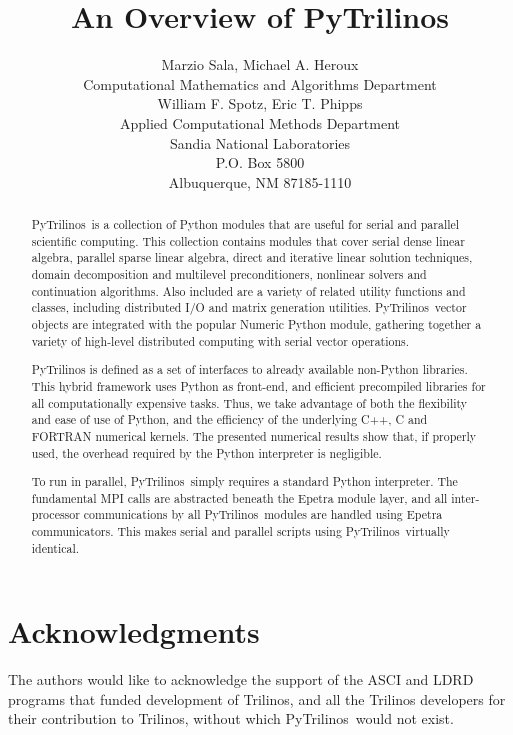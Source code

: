 \documentclass[10pt,relax]{SANDreport}
\author{Marzio Sala, Michael A. Heroux\\
Computational Mathematics and Algorithms Department \\ [10pt]
William F. Spotz, Eric T. Phipps \\
Applied Computational Methods Department \\ [10pt]
Sandia National Laboratories \\
P.O. Box 5800 \\
Albuquerque, NM 87185-1110 \\
}
\title{An Overview of PyTrilinos}
\newcommand{\PyTrilinos}{{PyTrilinos}}
\begin{document}
\maketitle

\begin{abstract}
\PyTrilinos\ is a collection of Python modules that are useful for
serial and parallel scientific computing. This collection contains
modules that cover serial dense linear algebra, parallel sparse linear
algebra, direct and iterative linear solution techniques, domain
decomposition and multilevel preconditioners, nonlinear solvers and
continuation algorithms. Also included are a variety of related
utility functions and classes, including distributed I/O and matrix generation
utilities.
\PyTrilinos\ vector objects are integrated with the popular Numeric
Python module, gathering together a variety of high-level distributed
computing with serial vector operations.

PyTrilinos is defined as a set of interfaces to already available non-Python
libraries.
This hybrid framework uses Python as front-end, and
efficient precompiled libraries for all computationally expensive tasks. Thus,
we take advantage of both the flexibility and ease of use of Python,
and the efficiency of the underlying C++, C and FORTRAN numerical
kernels. The presented numerical results show that, if properly used, the
overhead required by the Python interpreter is negligible. 

To run in parallel, \PyTrilinos\ simply requires a standard Python
interpreter.  The fundamental MPI calls are abstracted beneath the
Epetra module layer, and all inter-processor communications by all
\PyTrilinos\ modules are handled using Epetra communicators. This
makes serial and parallel scripts using \PyTrilinos\ virtually
identical.
\end{abstract}

\clearpage
\section*{Acknowledgments}
The authors would like to acknowledge the support of the ASCI and LDRD
programs that funded development of Trilinos, and all the Trilinos
developers for their contribution to Trilinos, without which
\PyTrilinos\ would not exist.

\medskip

\SANDmain
\tableofcontents
\newpage

\end{document}
